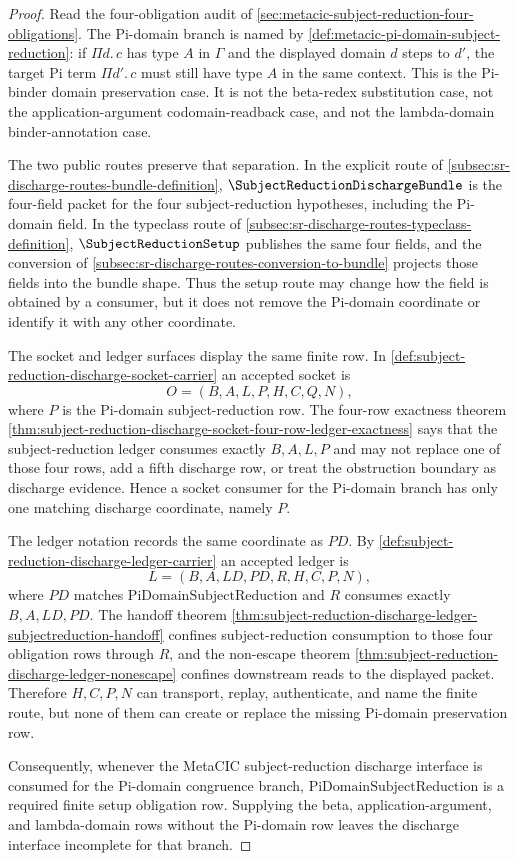 \begin{proof}
Read the four-obligation audit of \autoref{sec:metacic-subject-reduction-four-obligations}. The Pi-domain branch is named by \autoref{def:metacic-pi-domain-subject-reduction}: if $\Pi d.\,c$ has type $A$ in $\Gamma$ and the displayed domain $d$ steps to $d'$, the target Pi term $\Pi d'.\,c$ must still have type $A$ in the same context. This is the Pi-binder domain preservation case. It is not the beta-redex substitution case, not the application-argument codomain-readback case, and not the lambda-domain binder-annotation case.

The two public routes preserve that separation. In the explicit route of \autoref{subsec:sr-discharge-routes-bundle-definition}, $\SubjectReductionDischargeBundle$ is the four-field packet for the four subject-reduction hypotheses, including the Pi-domain field. In the typeclass route of \autoref{subsec:sr-discharge-routes-typeclass-definition}, $\SubjectReductionSetup$ publishes the same four fields, and the conversion of \autoref{subsec:sr-discharge-routes-conversion-to-bundle} projects those fields into the bundle shape. Thus the setup route may change how the field is obtained by a consumer, but it does not remove the Pi-domain coordinate or identify it with any other coordinate.

The socket and ledger surfaces display the same finite row. In \autoref{def:subject-reduction-discharge-socket-carrier} an accepted socket is
$$
O=(B,A,L,P,H,C,Q,N),
$$
where $P$ is the Pi-domain subject-reduction row. The four-row exactness theorem \autoref{thm:subject-reduction-discharge-socket-four-row-ledger-exactness} says that the subject-reduction ledger consumes exactly $B,A,L,P$ and may not replace one of those four rows, add a fifth discharge row, or treat the obstruction boundary as discharge evidence. Hence a socket consumer for the Pi-domain branch has only one matching discharge coordinate, namely $P$.

The ledger notation records the same coordinate as $PD$. By \autoref{def:subject-reduction-discharge-ledger-carrier} an accepted ledger is
$$
L=(B,A,LD,PD,R,H,C,P,N),
$$
where $PD$ matches $\mathrm{PiDomainSubjectReduction}$ and $R$ consumes exactly $B,A,LD,PD$. The handoff theorem \autoref{thm:subject-reduction-discharge-ledger-subjectreduction-handoff} confines subject-reduction consumption to those four obligation rows through $R$, and the non-escape theorem \autoref{thm:subject-reduction-discharge-ledger-nonescape} confines downstream reads to the displayed packet. Therefore $H,C,P,N$ can transport, replay, authenticate, and name the finite route, but none of them can create or replace the missing Pi-domain preservation row.

Consequently, whenever the MetaCIC subject-reduction discharge interface is consumed for the Pi-domain congruence branch, $\mathrm{PiDomainSubjectReduction}$ is a required finite setup obligation row. Supplying the beta, application-argument, and lambda-domain rows without the Pi-domain row leaves the discharge interface incomplete for that branch.
\end{proof}
